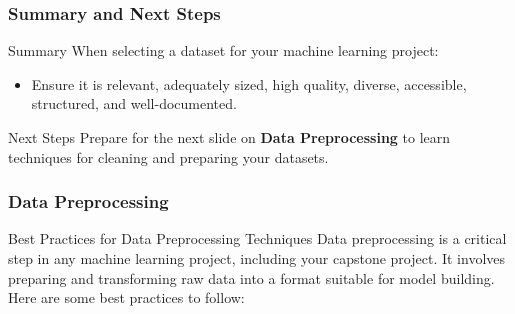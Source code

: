 \documentclass[aspectratio=169]{beamer}
\begin{document}
\begin{frame}[fragile]
    \frametitle{Summary and Next Steps}
    \begin{block}{Summary}
        When selecting a dataset for your machine learning project:
        \begin{itemize}
            \item Ensure it is relevant, adequately sized, high quality, diverse, accessible, structured, and well-documented.
        \end{itemize}
    \end{block}

    \begin{block}{Next Steps}
        Prepare for the next slide on \textbf{Data Preprocessing} to learn techniques for cleaning and preparing your datasets.
    \end{block}
\end{frame}

\begin{frame}
    \frametitle{Data Preprocessing}
    \begin{block}{Best Practices for Data Preprocessing Techniques}
        Data preprocessing is a critical step in any machine learning project, including your capstone project. It involves preparing and transforming raw data into a format suitable for model building. Here are some best practices to follow:
    \end{block}
\end{frame}
\end{document}
